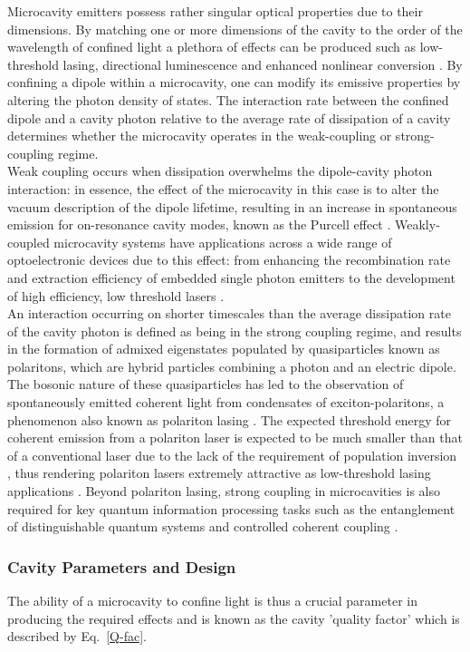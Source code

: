 Microcavity emitters possess rather singular optical properties due to their dimensions. By matching one or more dimensions of the cavity to the order of the wavelength of confined light a plethora of effects can be produced such as low-threshold lasing, directional luminescence and enhanced nonlinear conversion \cite{Christopoulos2007}. By confining a dipole within a microcavity, one can modify its emissive properties by altering the photon density of states. The interaction rate between the confined dipole and a cavity photon relative to the average rate of dissipation of a cavity determines whether the microcavity operates in the weak-coupling or strong-coupling regime.\\Weak coupling occurs when dissipation overwhelms the dipole-cavity photon interaction: in essence, the effect of the microcavity in this case is to alter the vacuum description of the dipole lifetime, resulting in an increase in spontaneous emission for on-resonance cavity modes, known as the Purcell effect \cite{Vahala2003}. Weakly-coupled microcavity systems have applications across a wide range of optoelectronic devices due to this effect: from enhancing the recombination rate and extraction efficiency of embedded single photon emitters \cite{Jarjour2007a} to the development of high efficiency, low threshold lasers \cite{Aharonovich2013}.\\An interaction occurring on shorter timescales than the average dissipation rate of the cavity photon is defined as being in the strong coupling regime, and results in the formation of admixed eigenstates populated by quasiparticles known as polaritons, which are hybrid particles combining a photon and an electric dipole. The bosonic nature of these quasiparticles has led to the observation of spontaneously emitted coherent light from condensates of exciton-polaritons,  a phenomenon also known as polariton lasing \cite{Malpuech2002}. The expected threshold energy for coherent emission from a polariton laser is expected to be much smaller than that of a conventional laser due to the lack of the requirement of population inversion , thus rendering polariton lasers extremely attractive as low-threshold lasing applications \cite{Christopoulos2007}. Beyond polariton lasing, strong coupling in microcavities is also required for key quantum information processing tasks such as the entanglement of distinguishable quantum systems and controlled coherent coupling \cite{Imamoglu1999,Hennessy2007}.

\subsubsection{Cavity Parameters and Design}
The ability of a microcavity to confine light is thus a crucial parameter in producing the required effects and is known as the cavity 'quality factor' which is described by Eq.~\ref{Q-fac}.

